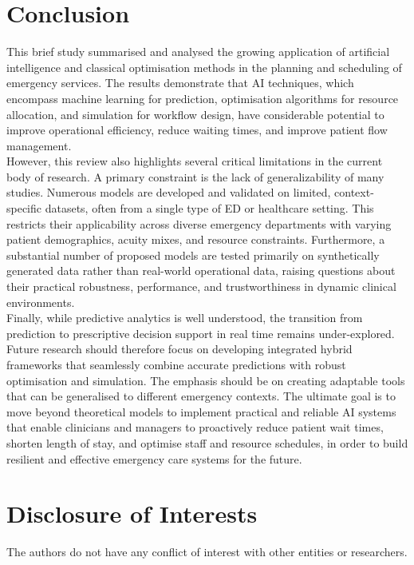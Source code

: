 \documentclass[runningheads]{llncs}
\begin{document}
\section{Conclusion}
This brief study summarised and analysed the growing application of artificial intelligence and classical optimisation methods in the planning and scheduling of emergency services. The results demonstrate that AI techniques, which encompass machine learning for prediction, optimisation algorithms for resource allocation, and simulation for workflow design, have considerable potential to improve operational efficiency, reduce waiting times, and improve patient flow management.\\
However, this review also highlights several critical limitations in the current body of research. A primary constraint is the lack of generalizability of many studies. Numerous models are developed and validated on limited, context-specific datasets, often from a single type of ED or healthcare setting. This restricts their applicability across diverse emergency departments with varying patient demographics, acuity mixes, and resource constraints. Furthermore, a substantial number of proposed models are tested primarily on synthetically generated data rather than real-world operational data, raising questions about their practical robustness, performance, and trustworthiness in dynamic clinical environments.\\
Finally, while predictive analytics is well understood, the transition from prediction to prescriptive decision support in real time remains under-explored. Future research should therefore focus on developing integrated hybrid frameworks that seamlessly combine accurate predictions with robust optimisation and simulation. The emphasis should be on creating adaptable tools that can be generalised to different emergency contexts. The ultimate goal is to move beyond theoretical models to implement practical and reliable AI systems that enable clinicians and managers to proactively reduce patient wait times, shorten length of stay, and optimise staff and resource schedules, in order to build resilient and effective emergency care systems for the future.

\section*{Disclosure of Interests}
\begin{normalsize}
The authors do not have any conflict of interest with other entities or researchers.
\end{normalsize}



\end{document}
